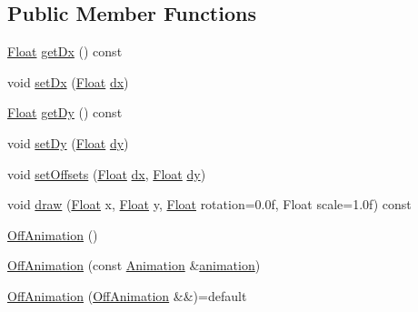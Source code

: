 \subsection*{Public Member Functions}
\begin{DoxyCompactItemize}
\item 
\hyperlink{namespaceZeta_a1e0a1265f9b3bd3075fb0fabd39088ba}{Float} \hyperlink{classZeta_1_1OffAnimation_af6892aee405005f1a6a6780ec17abb74}{get\+Dx} () const 
\item 
void \hyperlink{classZeta_1_1OffAnimation_a29b2a1bf936674bb92064e068a59227b}{set\+Dx} (\hyperlink{namespaceZeta_a1e0a1265f9b3bd3075fb0fabd39088ba}{Float} \hyperlink{classZeta_1_1OffAnimation_ab879452af04426400b413016d06e323d}{dx})
\item 
\hyperlink{namespaceZeta_a1e0a1265f9b3bd3075fb0fabd39088ba}{Float} \hyperlink{classZeta_1_1OffAnimation_a01223ad8f5db96ee89f87b8789a870f1}{get\+Dy} () const 
\item 
void \hyperlink{classZeta_1_1OffAnimation_a2bf334917852332c5497f7673daa2f10}{set\+Dy} (\hyperlink{namespaceZeta_a1e0a1265f9b3bd3075fb0fabd39088ba}{Float} \hyperlink{classZeta_1_1OffAnimation_ac8e57a2ab7810a34f1b984e72cb68081}{dy})
\item 
void \hyperlink{classZeta_1_1OffAnimation_aa4608197a8ea5ec14cbbbc6eca0aa3cc}{set\+Offsets} (\hyperlink{namespaceZeta_a1e0a1265f9b3bd3075fb0fabd39088ba}{Float} \hyperlink{classZeta_1_1OffAnimation_ab879452af04426400b413016d06e323d}{dx}, \hyperlink{namespaceZeta_a1e0a1265f9b3bd3075fb0fabd39088ba}{Float} \hyperlink{classZeta_1_1OffAnimation_ac8e57a2ab7810a34f1b984e72cb68081}{dy})
\item 
void \hyperlink{classZeta_1_1OffAnimation_a38f8d188be29034bf6016a1c77a3958d}{draw} (\hyperlink{namespaceZeta_a1e0a1265f9b3bd3075fb0fabd39088ba}{Float} x, \hyperlink{namespaceZeta_a1e0a1265f9b3bd3075fb0fabd39088ba}{Float} y, \hyperlink{namespaceZeta_a1e0a1265f9b3bd3075fb0fabd39088ba}{Float} rotation=0.\+0f, Float scale=1.\+0f) const 
\item 
\hyperlink{classZeta_1_1OffAnimation_a9cb93f415e60e930ab55af242db8f2e2}{Off\+Animation} ()
\item 
\hyperlink{classZeta_1_1OffAnimation_aceda997e51ad38e53eb3f852862529c3}{Off\+Animation} (const \hyperlink{classZeta_1_1Animation}{Animation} \&\hyperlink{classZeta_1_1AnimationPlayer_a4b97c373a921a0ea6a67c5371f346ddf}{animation})
\item 
\hyperlink{classZeta_1_1OffAnimation_a7c3ad661bf98f466022d4ad5a011ae8a}{Off\+Animation} (\hyperlink{classZeta_1_1OffAnimation}{Off\+Animation} \&\&)=default

\end{DoxyCompactItemize}
